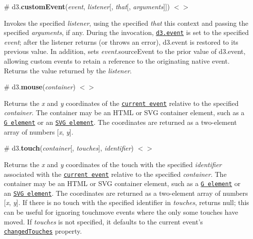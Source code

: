 \label{_customEvent}%
\# d3.{\bfseries custom\+Event}({\itshape event}, {\itshape listener}\mbox{[}, {\itshape that}\mbox{[}, {\itshape arguments}\mbox{]}\mbox{]}) \href{https://github.com/d3/d3-selection/blob/master/src/selection/on.js#L98}{\tt $<$$>$}

Invokes the specified {\itshape listener}, using the specified {\itshape that} {\ttfamily this} context and passing the specified {\itshape arguments}, if any. During the invocation, \href{#event}{\tt d3.\+event} is set to the specified {\itshape event}; after the listener returns (or throws an error), d3.\+event is restored to its previous value. In addition, sets {\itshape event}.source\+Event to the prior value of d3.\+event, allowing custom events to retain a reference to the originating native event. Returns the value returned by the {\itshape listener}.

\label{_mouse}%
\# d3.{\bfseries mouse}({\itshape container}) \href{https://github.com/d3/d3-selection/blob/master/src/mouse.js}{\tt $<$$>$}

Returns the {\itshape x} and {\itshape y} coordinates of the \href{#event}{\tt current event} relative to the specified {\itshape container}. The container may be an H\+T\+ML or S\+VG container element, such as a \href{http://www.w3.org/TR/SVG/struct.html#Groups}{\tt G element} or an \href{http://www.w3.org/TR/SVG/struct.html#SVGElement}{\tt S\+VG element}. The coordinates are returned as a two-\/element array of numbers \mbox{[}{\itshape x}, {\itshape y}\mbox{]}.

\label{_touch}%
\# d3.{\bfseries touch}({\itshape container}\mbox{[}, {\itshape touches}\mbox{]}, {\itshape identifier}) \href{https://github.com/d3/d3-selection/blob/master/src/touch.js}{\tt $<$$>$}

Returns the {\itshape x} and {\itshape y} coordinates of the touch with the specified {\itshape identifier} associated with the \href{#event}{\tt current event} relative to the specified {\itshape container}. The container may be an H\+T\+ML or S\+VG container element, such as a \href{http://www.w3.org/TR/SVG/struct.html#Groups}{\tt G element} or an \href{http://www.w3.org/TR/SVG/struct.html#SVGElement}{\tt S\+VG element}. The coordinates are returned as a two-\/element array of numbers \mbox{[}{\itshape x}, {\itshape y}\mbox{]}. If there is no touch with the specified identifier in {\itshape touches}, returns null; this can be useful for ignoring touchmove events where the only some touches have moved. If {\itshape touches} is not specified, it defaults to the current event’s \href{http://developer.apple.com/library/safari/documentation/UserExperience/Reference/TouchEventClassReference/TouchEvent/TouchEvent.html#//apple_ref/javascript/instp/TouchEvent/changedTouches}{\tt changed\+Touches} property.

